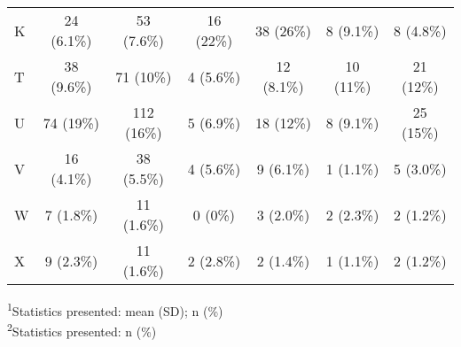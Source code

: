 \documentclass[]{book}
\begin{document}
\begin{longtable}{lcccccc}
K & 24 (6.1\%) & 53 (7.6\%) & 16 (22\%) & 38 (26\%) & 8 (9.1\%) & 8 (4.8\%) \\ 
T & 38 (9.6\%) & 71 (10\%) & 4 (5.6\%) & 12 (8.1\%) & 10 (11\%) & 21 (12\%) \\ 
U & 74 (19\%) & 112 (16\%) & 5 (6.9\%) & 18 (12\%) & 8 (9.1\%) & 25 (15\%) \\ 
V & 16 (4.1\%) & 38 (5.5\%) & 4 (5.6\%) & 9 (6.1\%) & 1 (1.1\%) & 5 (3.0\%) \\ 
W & 7 (1.8\%) & 11 (1.6\%) & 0 (0\%) & 3 (2.0\%) & 2 (2.3\%) & 2 (1.2\%) \\ 
X & 9 (2.3\%) & 11 (1.6\%) & 2 (2.8\%) & 2 (1.4\%) & 1 (1.1\%) & 2 (1.2\%) \\ 
\bottomrule
\end{longtable}
\vspace{-5mm}
\begin{minipage}{\linewidth}
\textsuperscript{1}Statistics presented: mean (SD); n (\%) \\ 
\textsuperscript{2}Statistics presented: n (\%) \\ 
\end{minipage}
\end{document}

